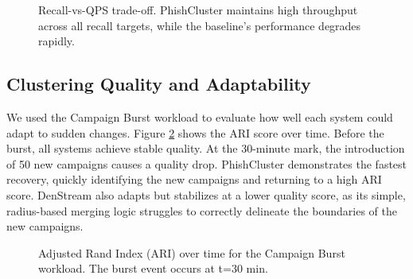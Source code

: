 \documentclass[journal,article,submit,pdftex,moreauthors]{Definitions/mdpi}
\begin{document}
\begin{figure}[h!]
\centering
{}
\caption{Recall-vs-QPS trade-off. PhishCluster maintains high throughput across all recall targets, while the baseline's performance degrades rapidly.}
\label{fig:recall_qps}
\end{figure}

\subsection{Clustering Quality and Adaptability}

We used the Campaign Burst workload to evaluate how well each system could adapt to sudden changes. Figure \ref{fig:ari_burst} shows the ARI score over time. Before the burst, all systems achieve stable quality. At the 30-minute mark, the introduction of 50 new campaigns causes a quality drop. PhishCluster demonstrates the fastest recovery, quickly identifying the new campaigns and returning to a high ARI score. DenStream also adapts but stabilizes at a lower quality score, as its simple, radius-based merging logic struggles to correctly delineate the boundaries of the new campaigns.

\begin{figure}[h!]
\centering
{}
\caption{Adjusted Rand Index (ARI) over time for the Campaign Burst workload. The burst event occurs at t=30 min.}
\label{fig:ari_burst}
\end{figure}
\end{document}

